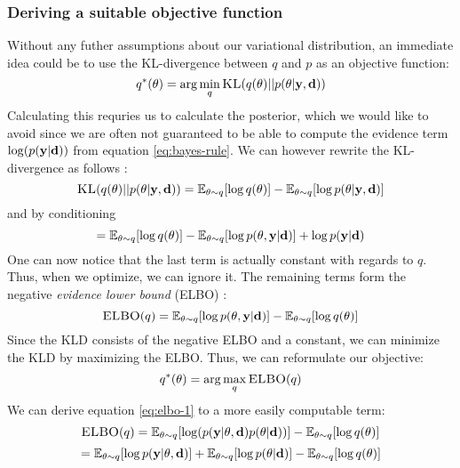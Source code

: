 \subsubsection{Deriving a suitable objective function}
Without any futher assumptions about our variational distribution, an immediate idea could be to use the KL-divergence between $q$ and $p$ as an objective function:
\begin{equation}\label{eq:kld}q^*(\theta) = \arg \min_{q} \textsc{KL}(q(\theta) || p(\theta | \mathbf{y}, \mathbf{d}))\end{equation}
Calculating this requries us to calculate the posterior, which we would like to avoid since we are often not guaranteed to be able to compute the evidence term $\log(p(\mathbf{y} | \mathbf{d}))$ from equation \ref{eq:bayes-rule}.
We can however rewrite the KL-divergence as follows \cite{blei17}:
\begin{equation}\textsc{KL}(q(\theta)|| p(\theta| \mathbf{y}, \mathbf{d})) = \mathbb{E}_{\theta \sim q}[\log q(\theta)] - \mathbb{E}_{\theta \sim q}[\log p(\theta|\mathbf{y}, \mathbf{d})]\end{equation}
and by conditioning
\begin{equation}\label{eq:kld-2}= \mathbb{E}_{\theta \sim q}[\log q(\theta)] - \mathbb{E}_{\theta \sim q}[\log p(\theta, \mathbf{y}| \mathbf{d})] + \log p(\mathbf{y}| \mathbf{d})\end{equation}
One can now notice that the last term is actually constant with regards to $q$.
Thus, when we optimize, we can ignore it. The remaining terms form the negative \textit{evidence lower bound} (ELBO) \cite{blei17}:
\begin{equation}\label{eq:elbo-1}\textsc{ELBO}(q)= \mathbb{E}_{\theta \sim q}[\log p(\theta, \mathbf{y}| \mathbf{d})]-\mathbb{E}_{\theta \sim q}[\log q(\theta)]\end{equation}
Since the KLD consists of the negative ELBO and a constant, we can minimize the KLD by maximizing the ELBO. Thus, we can reformulate our objective:
\begin{equation}\label{eq:elbo-objective}q^*(\theta) = \arg \max_{q} \textsc{ELBO}(q)\end{equation}
We can derive equation \ref{eq:elbo-1} to a more easily computable term:
\begin{equation}\label{eq:elbo-2}\textsc{ELBO}(q) = \mathbb{E}_{\theta \sim q}[\log (p(\mathbf{y}| \theta , \mathbf{d})p(\theta | \mathbf{d}))] - \mathbb{E}_{\theta \sim q}[\log q(\theta)]\end{equation}
\begin{equation}= \mathbb{E}_{\theta \sim q}[\log p(\mathbf{y}| \theta , \mathbf{d})]+\mathbb{E}_{\theta \sim q}[\log p(\theta | \mathbf{d})] - \mathbb{E}_{\theta \sim q}[\log q(\theta)]\end{equation}
